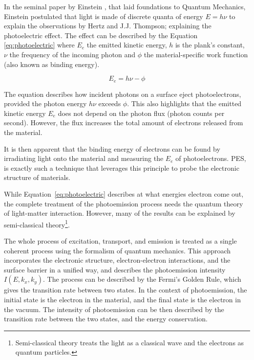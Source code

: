In the seminal paper by Einstein \cite{einsteinUberErzeugungUnd1905}, that laid foundations to Quantum Mechanics, Einstein postulated that light is made of discrete quanta of energy $E = h\nu$ to explain the observations by Hertz and J.J. Thompson; explaining the photoelectric effect. The effect can be described by the Equation \ref{eq:photoelectric} where $E_e$ the emitted kinetic energy, $h$ is the plank's constant, $\nu$ the frequency of the incoming photon and  $\phi$ the material-specific work function (also known as binding energy). 

\begin{equation}\label{eq:photoelectric}
    E_e = h\nu - \phi
\end{equation}

The equation describes how incident photons on a surface eject photoelectrons, provided the photon energy $h\nu$ exceeds $\phi$. This also highlights that the emitted kinetic energy $E_e$ does not depend on the photon flux (photon counts per second). However, the flux increases the total amount of electrons released from the material.

It is then apparent that the binding energy of electrons can be found by irradiating light onto the material and measuring the $E_e$ of photoelectrons. \gls{PES}, is exactly such a technique that leverages this principle to probe the electronic structure of materials.

While Equation~\ref{eq:photoelectric} describes at what energies electron come out, the complete treatment of the photoemission process needs the quantum theory of light-matter interaction. However, many of the results can be explained by semi-classical theory\footnote{Semi-classical theory treats the light as a classical wave and the electrons as quantum particles.}.

The whole process of excitation, transport, and emission is treated as a single coherent process using the formalism of quantum mechanics. This approach incorporates the electronic structure, electron-electron interactions, and the surface barrier in a unified way, and describes the photoemission intensity  $I(E, k_x, k_y)$. The process can be described by the Fermi's Golden Rule, which gives the transition rate between two states. In the context of photoemission, the initial state is the electron in the material, and the final state is the electron in the vacuum. The intensity of photoemission can be then described by the transition rate between the two states, and the energy conservation.

